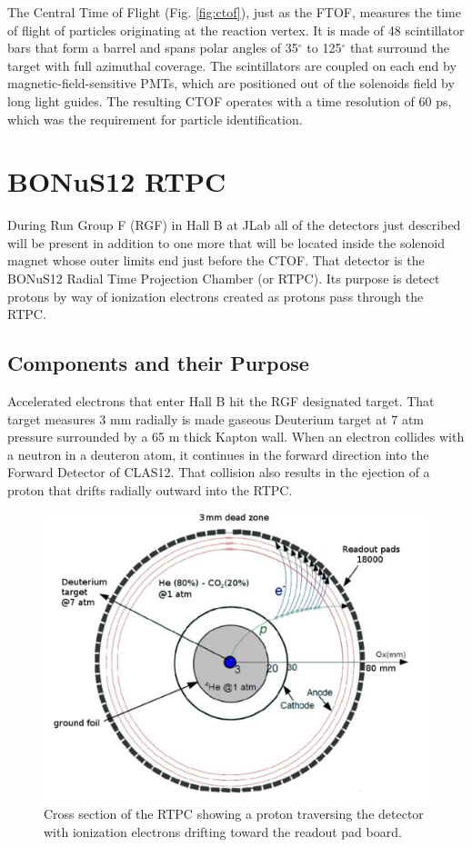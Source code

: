 The Central Time of Flight (Fig. \ref{fig:ctof}), just as the FTOF, measures the time of flight of particles originating at the reaction vertex. It is made of 48 scintillator bars that form a barrel and spans polar angles of 35$^{\circ}$ to 125$^{\circ}$ that surround the target with full azimuthal coverage. The scintillators are coupled on each end by magnetic-field-sensitive PMTs, which are positioned out of the solenoids field by long light guides. The resulting CTOF operates with a time resolution of 60 ps, which was the requirement for particle identification.

\section{BONuS12 RTPC}
During Run Group F (RGF) in Hall B at JLab all of the detectors just described will be present in addition to one more that will be located inside the solenoid magnet whose outer limits end just before the CTOF. That detector is the BONuS12 Radial Time Projection Chamber (or RTPC). Its purpose is detect protons by way of ionization electrons created as protons pass through the RTPC.

\subsection{Components and their Purpose}
Accelerated electrons that enter Hall B hit the RGF designated target. That target measures 3 mm radially is made gaseous Deuterium target at 7 atm pressure surrounded by a 65 \textmu m thick Kapton wall. When an electron collides with a neutron in a deuteron atom, it continues in the forward direction into the Forward Detector of CLAS12. That collision also results in the ejection of a proton that drifts radially outward into the RTPC.

\begin{figure}[h!]
	\centering
	\includegraphics[width=0.8\linewidth]{figures/rtpc_op.png}
	\caption{Cross section of the RTPC showing a proton traversing the detector with ionization electrons drifting toward the readout pad board.}
	\label{fig:rtpc_op}
\end{figure}

